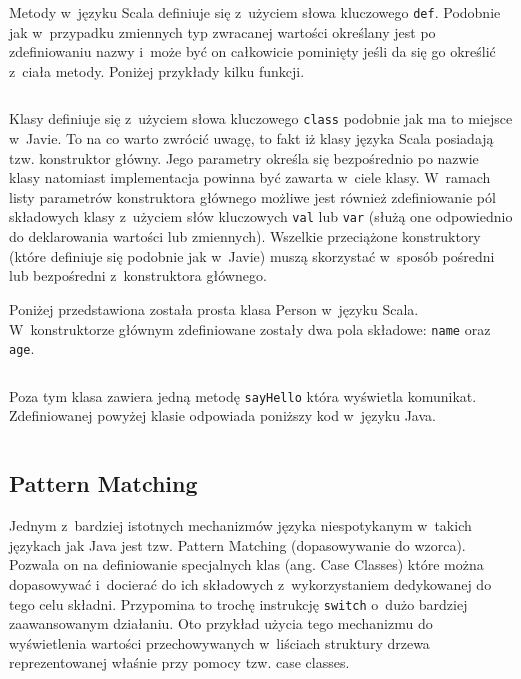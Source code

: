 \documentclass[brudnopis]{xmgr}
\begin{document}
Metody w~języku Scala definiuje się z~użyciem słowa kluczowego \texttt{def}. Podobnie jak w~przypadku zmiennych typ zwracanej wartości określany jest po zdefiniowaniu nazwy i~może być on całkowicie pominięty jeśli da się go określić z~ciała metody. Poniżej przykłady kilku funkcji.

\inputminted{scala}{listings/scala/functions-example.scala}

Klasy definiuje się z~użyciem słowa kluczowego \texttt{class} podobnie jak ma to miejsce w~Javie. To na co warto zwrócić uwagę, to fakt iż klasy języka Scala posiadają tzw. konstruktor główny. Jego parametry określa się bezpośrednio po nazwie klasy natomiast implementacja powinna być zawarta w~ciele klasy. W~ramach listy parametrów konstruktora głównego możliwe jest również zdefiniowanie pól składowych klasy z~użyciem słów kluczowych \texttt{val} lub \texttt{var} (służą one odpowiednio do deklarowania wartości lub zmiennych). Wszelkie przeciążone konstruktory (które definiuje się podobnie jak w~Javie) muszą skorzystać w~sposób pośredni lub bezpośredni z~konstruktora głównego.

Poniżej przedstawiona została prosta klasa Person w~języku Scala. W~konstruktorze głównym zdefiniowane zostały dwa pola składowe: \texttt{name} oraz \texttt{age}.

\inputminted{scala}{listings/scala/simple-class-person.scala}

Poza tym klasa zawiera jedną metodę \texttt{sayHello} która wyświetla komunikat.
Zdefiniowanej powyżej klasie odpowiada poniższy kod w~języku Java.

\inputminted{scala}{listings/java/simple-class-person.java}

\subsection{Pattern Matching}

Jednym z~bardziej istotnych mechanizmów języka niespotykanym w~takich językach jak Java jest tzw. Pattern Matching (dopasowywanie do wzorca). Pozwala on na definiowanie specjalnych klas (ang. Case Classes) które można dopasowywać i~docierać do ich składowych z~wykorzystaniem dedykowanej do tego celu składni. Przypomina to trochę instrukcję \texttt{switch} o~dużo bardziej zaawansowanym działaniu. Oto przykład użycia tego mechanizmu do wyświetlenia wartości przechowywanych w~liściach struktury drzewa reprezentowanej właśnie przy pomocy tzw. case classes.
\newpage
\inputminted{scala}{listings/scala/pattern-matching-trees.scala}
\end{document}
